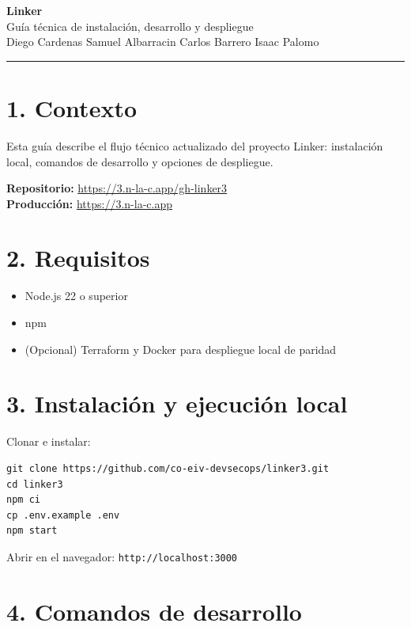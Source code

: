 \documentclass[12pt]{article}
\begin{document}
\begin{center}
  {\LARGE \textbf{Linker}} \\[6pt]
  {\large Guía técnica de instalación, desarrollo y despliegue} \\[4pt]
  \small Diego Cardenas \quad Samuel Albarracin \quad Carlos Barrero \quad Isaac Palomo
\end{center}

\vspace{6pt}
\hrule
\vspace{14pt}

\section{1. Contexto}

Esta guía describe el flujo técnico actualizado del proyecto Linker: instalación local, comandos de desarrollo y opciones de despliegue.

\textbf{Repositorio:} \url{https://3.n-la-c.app/gh-linker3} \\
\textbf{Producción:} \url{https://3.n-la-c.app}

\section{2. Requisitos}

\begin{itemize}
  \item Node.js 22 o superior
  \item npm
  \item (Opcional) Terraform y Docker para despliegue local de paridad
\end{itemize}

\section{3. Instalación y ejecución local}

Clonar e instalar:

\begin{lstlisting}
git clone https://github.com/co-eiv-devsecops/linker3.git
cd linker3
npm ci
cp .env.example .env
npm start
\end{lstlisting}

Abrir en el navegador: \texttt{http://localhost:3000}

\section{4. Comandos de desarrollo}
\end{document}
